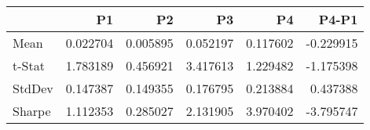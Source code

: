 \begin{tabular}{lrrrrr}
\toprule
 & P1 & P2 & P3 & P4 & P4-P1 \\
\midrule
Mean & 0.022704 & 0.005895 & 0.052197 & 0.117602 & -0.229915 \\
t-Stat & 1.783189 & 0.456921 & 3.417613 & 1.229482 & -1.175398 \\
StdDev & 0.147387 & 0.149355 & 0.176795 & 0.213884 & 0.437388 \\
Sharpe & 1.112353 & 0.285027 & 2.131905 & 3.970402 & -3.795747 \\
\bottomrule
\end{tabular}
